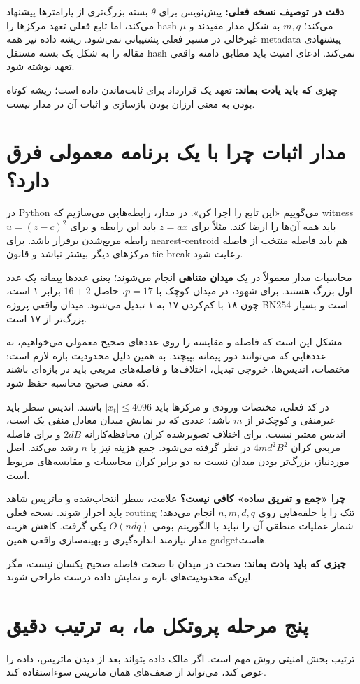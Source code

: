 \documentclass[11pt,a4paper]{article}
\newcommand{\lesson}[1]{\clearpage\section{#1}}
\newcommand{\takeaway}[1]{\par\textbf{چیزی که باید یادت بماند:} #1\par}
\begin{document}
\textbf{دقت در توصیف نسخه فعلی:} پیش‌نویس برای \(\theta\) بسته بزرگ‌تری از پارامترها پیشنهاد می‌کند، اما تابع فعلی تعهد مرکزها را hash می‌کند؛ \(m,q\) به شکل مدار مقیدند و \(\mu\) غیرخالی در مسیر فعلی پشتیبانی نمی‌شود. ریشه داده نیز همه metadata پیشنهادی مقاله را به شکل یک بسته مستقل hash نمی‌کند. ادعای امنیت باید مطابق دامنه واقعی تعهد نوشته شود.

\takeaway{تعهد یک قرارداد برای ثابت‌ماندن داده است؛ ریشه کوتاه بودن به معنی ارزان بودن بازسازی و اثبات آن در مدار نیست.}

\lesson{مدار اثبات چرا با یک برنامه معمولی فرق دارد؟}
در Python می‌گوییم «این تابع را اجرا کن». در مدار، رابطه‌هایی می‌سازیم که witness باید همه آن‌ها را ارضا کند. مثلاً برای \(z=ax\) باید این رابطه و برای \(u=(z-c)^2\) رابطه مربع‌شدن برقرار باشد. برای nearest-centroid هم باید فاصله منتخب از فاصله مرکزهای دیگر بیشتر نباشد و قانون tie-break رعایت شود.

محاسبات مدار معمولاً در یک \textbf{میدان متناهی} انجام می‌شوند؛ یعنی عددها پیمانه یک عدد اول بزرگ هستند. برای شهود، در میدان کوچک با \(p=17\)، حاصل \(16+2\) برابر ۱ است، چون ۱۸ با کم‌کردن ۱۷ به ۱ تبدیل می‌شود. میدان واقعی پروژه BN254 است و بسیار بزرگ‌تر از ۱۷ است.

مشکل این است که فاصله و مقایسه را روی عددهای صحیح معمولی می‌خواهیم، نه عددهایی که می‌توانند دور پیمانه بپیچند. به همین دلیل محدودیت بازه لازم است: مختصات، اندیس‌ها، خروجی تبدیل، اختلاف‌ها و فاصله‌های مربعی باید در بازه‌ای باشند که معنی صحیح محاسبه حفظ شود.

در کد فعلی، مختصات ورودی و مرکزها باید \(|x_t|\le4096\) باشند. اندیس سطر باید غیرمنفی و کوچک‌تر از \(m\) باشد؛ عددی که در نمایش میدان معادل منفی یک است، اندیس معتبر نیست. برای اختلاف تصویرشده کران محافظه‌کارانه \(2dB\) و برای فاصله مربعی کران \(4md^2B^2\) در نظر گرفته می‌شود. جمع هزینه نیز با \(n\) رشد می‌کند. اصل موردنیاز، بزرگ‌تر بودن میدان نسبت به دو برابر کران محاسبات و مقایسه‌های مربوط است.

\textbf{چرا «جمع و تفریق ساده» کافی نیست؟} علامت، سطر انتخاب‌شده و ماتریس شاهد باید احراز شوند. نسخه فعلی routing تنک را با حلقه‌هایی روی \(n,m,d,q\) انجام می‌دهد؛ شمار عملیات منطقی آن را نباید با الگوریتم بومی \(O(ndq)\) یکی گرفت. کاهش هزینه مدار نیازمند اندازه‌گیری و بهینه‌سازی واقعی همین gadgetهاست.

\takeaway{صحت در میدان با صحت فاصله صحیح یکسان نیست، مگر این‌که محدودیت‌های بازه و نمایش داده درست طراحی شوند.}

\lesson{پنج مرحله پروتکل ما، به ترتیب دقیق}
ترتیب بخش امنیتی روش مهم است. اگر مالک داده بتواند بعد از دیدن ماتریس، داده را عوض کند، می‌تواند از ضعف‌های همان ماتریس سوءاستفاده کند.
\end{document}

